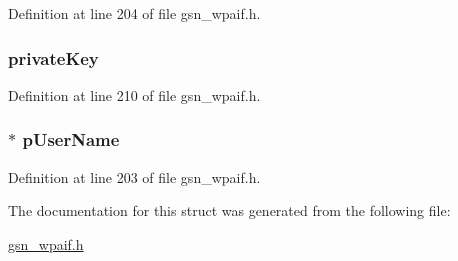 Definition at line 204 of file gsn\_\-wpaif.h.

\hypertarget{a00423_a2204610fc64182c150aa6c0523a8a017}{
\subsubsection[{privateKey}]{ {\bf privateKey}}}
\label{a00423_a2204610fc64182c150aa6c0523a8a017}


Definition at line 210 of file gsn\_\-wpaif.h.

\hypertarget{a00423_ab8e7846ab3c3642c81c6cc0e9ac697c6}{
\subsubsection[{pUserName}]{$\ast$ {\bf pUserName}}}
\label{a00423_ab8e7846ab3c3642c81c6cc0e9ac697c6}


Definition at line 203 of file gsn\_\-wpaif.h.



The documentation for this struct was generated from the following file:\begin{DoxyCompactItemize}
\item 
\hyperlink{a00615}{gsn\_\-wpaif.h}\end{DoxyCompactItemize}
